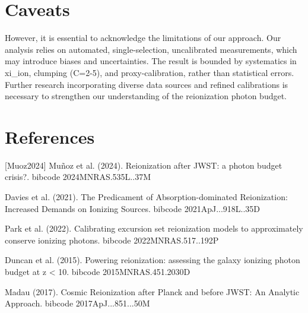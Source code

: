 \documentclass[twocolumn]{aastex631}
\begin{document}
\section{Caveats}
However, it is essential to acknowledge the limitations of our approach. Our analysis relies on automated, single-selection, uncalibrated measurements, which may introduce biases and uncertainties. The result is bounded by systematics in xi\_ion, clumping (C=2-5), and proxy-calibration, rather than statistical errors. Further research incorporating diverse data sources and refined calibrations is necessary to strengthen our understanding of the reionization photon budget.
\section*{References}
\footnotesize
[Muoz2024] Muñoz et al. (2024). Reionization after JWST: a photon budget crisis?. bibcode 2024MNRAS.535L..37M \par [Davies2021] Davies et al. (2021). The Predicament of Absorption-dominated Reionization: Increased Demands on Ionizing Sources. bibcode 2021ApJ...918L..35D \par [Park2022] Park et al. (2022). Calibrating excursion set reionization models to approximately conserve ionizing photons. bibcode 2022MNRAS.517..192P \par [Duncan2015] Duncan et al. (2015). Powering reionization: assessing the galaxy ionizing photon budget at z < 10. bibcode 2015MNRAS.451.2030D \par [Madau2017] Madau (2017). Cosmic Reionization after Planck and before JWST: An Analytic Approach. bibcode 2017ApJ...851...50M
\end{document}
